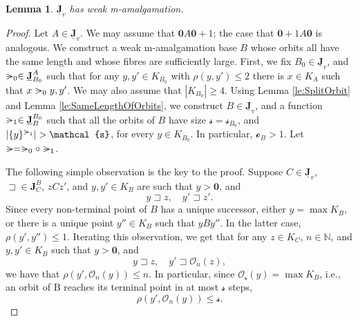 \documentclass[12pt]{amsart}
\numberwithin{equation}{section}
\theoremstyle{plain}
\newtheorem{lemma}[theorem]{Lemma}
\theoremstyle{definition}
\newcommand{\nil}{\mathrel{\vphantom{>}\text{\mathsurround=0pt\ooalign{$>$\cr$-$\cr}}}}
\newcommand \sqsp{\sqsupset}
\newcommand \la{\leftarrow}
\newcommand \tla{\twoheadleftarrow}
\newcommand \rt{\mathbf{0}}
\newcommand \JJb{\mathbf{J}}
\newcommand \JJub{\underline{\mathbf{J}}}
\newcommand \OO{\mathcal{O}}
\newcommand \oo{\mathcal{o}}
\newcommand \sss{\mathcal{s}}
\newcommand \NN{\mathbb{N}}
\begin{document}
\begin{lemma}
	\label{le:IvHasAP}
	$\JJub_v$ has weak m-amalgamation.
\end{lemma}

\begin{proof}
Let $A \in \JJub_v$.  We may assume that $\rt A \rt+1$; the case that $\rt+1 A \rt$ is analogous. We construct a weak m-amalgamation base $B$ whose orbits all have the same length and whose fibres are sufficiently large. First, we fix $B_0 \in \JJub_v$, and $\nil_0 \in \JJub^{A}_{B_0}$ such that for any $y,y' \in K_{B_0}$ with $\rho(y,y') \leq 2$ there is $x \in K_{A}$ such that $x \nil_0 y,y'$. We may also assume that $|K_{B_0}| \geq 4$.  Using Lemma \ref{le:SplitOrbit} and Lemma \ref{le:SameLengthOfOrbits}, we construct $B \in \JJub_v$, and a function $\nil_1 \in \JJub^{B_0}_{B}$ such that all the orbits of $B$ have size $\sss=\sss_{B_0}$, and $|\{y\}^{\nil_1} |>\sss$, for every $y \in K_{B_0}$. In particular, $\oo_{B}>1$. Let $\nil=\nil_0 \circ \nil_1$.

The following simple observation is the key to the proof. Suppose $C \in \JJub_v$, $\sqsp \in \JJb^{B}_{C}$, $z C z'$, and $y, y' \in K_{B}$ are such that $y>\rt$, and $$y \sqsp z, \quad y' \sqsp z'.$$ %
Since every non-terminal point of $B$ has a unique successor, either $y=\max K_ B$, or there is a unique point $y'' \in K_B$ such that $yBy''$. In the latter case, $\rho(y',y'') \leq 1$. Iterating this observation, we get that for any $z \in K_C$, $n \in \NN$, and $y, y' \in K_{B}$ such that $y> \rt$, and $$y \sqsp z, \quad y' \sqsp \OO_n(z),$$ we have that $\rho(y',\OO_n(y)) \leq n$. In particular, since $\OO_\sss(y)=\max K_{B}$, i.e., an orbit of B reaches its terminal point in at most $\sss$ steps, $$\rho(y',\OO_n(y)) \leq \sss.$$


\end{proof}
\end{document}
